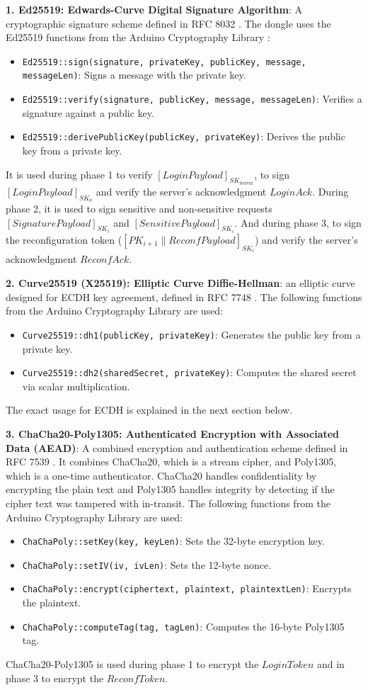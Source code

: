 \textbf{1. Ed25519: Edwards-Curve Digital Signature Algorithm}: A cryptographic signature scheme defined in RFC 8032 \cite{rfc8032}. The dongle uses the Ed25519 functions from the Arduino Cryptography Library \cite{arduinolibs_crypto}:
\begin{itemize}
    \item \texttt{Ed25519::sign(signature, privateKey, publicKey, message, messageLen)}: Signs a message with the private key.
    \item \texttt{Ed25519::verify(signature, publicKey, message, messageLen)}: Verifies a signature against a public key.
    \item \texttt{Ed25519::derivePublicKey(publicKey, privateKey)}: Derives the public key from a private key.
\end{itemize}
It is used during phase 1 to verify $[LoginPayload]_{SK_{\text{Server}}}$, to sign $[LoginPayload]_{SK_0}$ and verify the server's acknowledgment $LoginAck$. During phase 2, it is used to sign sensitive and non-sensitive requests $[SignaturePayload]_{SK_i}$ and $[SensitivePayload]_{SK_i}$. And during phase 3, to sign the reconfiguration token  ($[PK_{i+1} \| ReconfPayload]_{SK_i}$) and verify the server's acknowledgment $ReconfAck$.

\textbf{2. Curve25519 (X25519): Elliptic Curve Diffie-Hellman}: an elliptic curve designed for ECDH key agreement, defined in RFC 7748 \cite{rfc7748}. The following functions from the Arduino Cryptography Library are used:
\begin{itemize}
    \item \texttt{Curve25519::dh1(publicKey, privateKey)}: Generates the public key from a private key.
    \item \texttt{Curve25519::dh2(sharedSecret, privateKey)}: Computes the shared secret via scalar multiplication.
\end{itemize}
The exact usage for ECDH is explained in the next section below.

\textbf{3. ChaCha20-Poly1305: Authenticated Encryption with Associated Data (AEAD)}: A combined encryption and authentication scheme defined in RFC 7539 \cite{rfc7539}. It combines ChaCha20, which is a stream cipher, and Poly1305, which is a one-time authenticator. ChaCha20 handles confidentiality by encrypting the plain text and Poly1305 handles integrity by detecting if the cipher text was tampered with in-transit. The following functions from the Arduino Cryptography Library are used:
\begin{itemize}
    \item \texttt{ChaChaPoly::setKey(key, keyLen)}: Sets the 32-byte encryption key.
    \item \texttt{ChaChaPoly::setIV(iv, ivLen)}: Sets the 12-byte nonce.
    \item \texttt{ChaChaPoly::encrypt(ciphertext, plaintext, plaintextLen)}: Encrypts the plaintext.
    \item \texttt{ChaChaPoly::computeTag(tag, tagLen)}: Computes the 16-byte Poly1305 tag.
\end{itemize}
ChaCha20-Poly1305 is used during phase 1 to encrypt the $LoginToken$ and in phase 3 to encrypt the $ReconfToken$.

